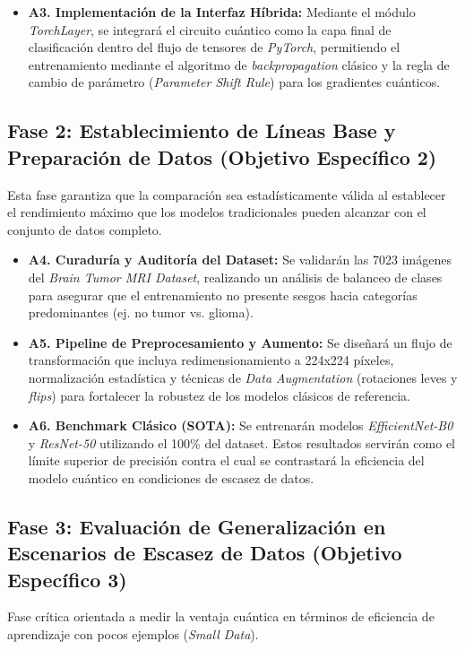 \documentclass[12pt,letterpaper]{article}
\begin{document}
\begin{itemize}
        \item \textbf{A3. Implementación de la Interfaz Híbrida:} Mediante el módulo \textit{TorchLayer}, se integrará el circuito cuántico como la capa final de clasificación dentro del flujo de tensores de \textit{PyTorch}, permitiendo el entrenamiento mediante el algoritmo de \textit{backpropagation} clásico y la regla de cambio de parámetro (\textit{Parameter Shift Rule}) para los gradientes cuánticos.
    \end{itemize}
    
    \subsection{Fase 2: Establecimiento de Líneas Base y Preparación de Datos (Objetivo Específico 2)}
    Esta fase garantiza que la comparación sea estadísticamente válida al establecer el rendimiento máximo que los modelos tradicionales pueden alcanzar con el conjunto de datos completo.
    
    \begin{itemize}
        \item \textbf{A4. Curaduría y Auditoría del Dataset:} Se validarán las 7023 imágenes del \textit{Brain Tumor MRI Dataset}, realizando un análisis de balanceo de clases para asegurar que el entrenamiento no presente sesgos hacia categorías predominantes (ej. no tumor vs. glioma).
        \item \textbf{A5. Pipeline de Preprocesamiento y Aumento:} Se diseñará un flujo de transformación que incluya redimensionamiento a 224x224 píxeles, normalización estadística y técnicas de \textit{Data Augmentation} (rotaciones leves y \textit{flips}) para fortalecer la robustez de los modelos clásicos de referencia.
        \item \textbf{A6. Benchmark Clásico (SOTA):} Se entrenarán modelos \textit{EfficientNet-B0} y \textit{ResNet-50} utilizando el 100\% del dataset. Estos resultados servirán como el límite superior de precisión contra el cual se contrastará la eficiencia del modelo cuántico en condiciones de escasez de datos.
    \end{itemize}
    
    \subsection{Fase 3: Evaluación de Generalización en Escenarios de Escasez de Datos (Objetivo Específico 3)}
    Fase crítica orientada a medir la ventaja cuántica en términos de eficiencia de aprendizaje con pocos ejemplos (\textit{Small Data}).
    
\end{document}
